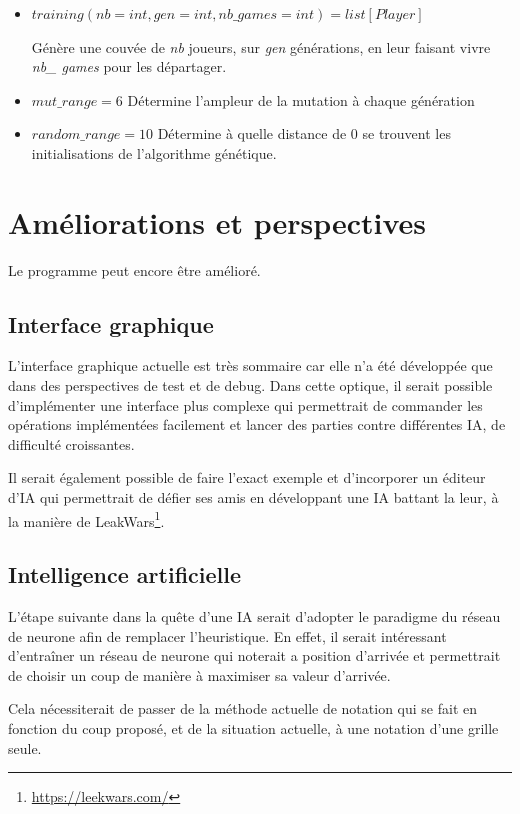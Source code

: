 \documentclass[10pt]{article}
\begin{document}
\begin{enumerate}
\begin{itemize}
\begin{itemize}
\item $training(nb=int, gen= int, nb\_games=int)=list[Player]$ \par Génère une couvée de \emph{nb} joueurs, sur \emph{gen} générations, en leur faisant vivre \emph{nb\_ games} pour les départager.
\item $mut\_range = 6$ \qquad Détermine l'ampleur de la mutation à chaque génération
\item $random\_range = 10$ \qquad Détermine à quelle distance de $0$ se trouvent les initialisations de l'algorithme génétique.
\end{itemize}



\section{Améliorations et perspectives}
Le programme peut encore être amélioré.
\subsection{Interface graphique}
L'interface graphique actuelle est très sommaire car elle n'a été développée que dans des perspectives de test et de debug. Dans cette optique, il serait possible d'implémenter une interface plus complexe qui permettrait de commander les opérations implémentées facilement et lancer des parties contre différentes IA, de difficulté croissantes.
\par Il serait également possible de faire l'exact exemple et d'incorporer un éditeur d'IA qui permettrait de défier ses amis en développant une IA battant la leur, à la manière de LeakWars\footnote{\url{https://leekwars.com/}}.

\subsection{Intelligence artificielle}
L'étape suivante dans la quête d'une IA serait d'adopter le paradigme du réseau de neurone afin de remplacer l'heuristique. En effet, il serait intéressant d'entraîner un réseau de neurone qui noterait a position d'arrivée et permettrait de choisir un coup de manière à maximiser sa valeur d'arrivée.
\par Cela nécessiterait de passer de la méthode actuelle de notation qui se fait en fonction du coup proposé, et de la situation actuelle, à une notation d'une grille seule.


\end{itemize}
\end{enumerate}
\end{document}
